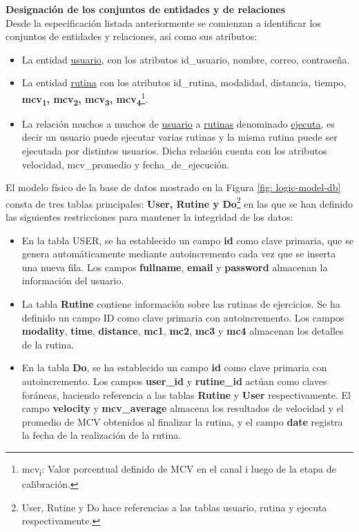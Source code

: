 \textbf{Designación de los conjuntos de entidades y de relaciones}\\
Desde la especificación listada anteriormente se comienzan a
identificar los conjuntos de entidades y relaciones, así como sus atributos:
\begin{itemize}
    \item La entidad \underline{usuario}, con los atributos id\_usuario, nombre, correo, contraseña.
    \item La entidad \underline{rutina} con los atributos id\_rutina, modalidad, distancia, tiempo, \textbf{mcv\textsubscript{1}, mcv\textsubscript{2}, mcv\textsubscript{3}, mcv\textsubscript{4}}\footnote{mcv\textsubscript{i}: Valor porcentual definido de MCV en el canal i luego de la etapa de calibración.}.
    \item La relación muchos a muchos de \underline{usuario} a \underline{rutinas} denominado \underline{ejecuta}, es decir un usuario puede ejecutar 
    varias rutinas y la misma rutina puede ser ejecutada por distintos usuarios. Dicha relación cuenta con los atributos velocidad, mcv\_promedio y fecha\_de\_ejecución. 
\end{itemize}
    
El modelo físico de la base de datos mostrado en la Figura \ref{fig: logic-model-db} consta de tres tablas principales: \textbf{User, Rutine y Do}\footnote{User, Rutine y Do hace referencias a las tablas usuario, rutina y ejecuta respectivamente.} en las que se han definido las siguientes restricciones para mantener la integridad de los datos:

\begin{itemize}
    \item En la tabla USER, se ha establecido un campo \textbf{id} como clave primaria, que se genera automáticamente mediante autoincremento cada vez que se inserta una nueva fila. Los campos \textbf{fullname}, \textbf{email} y \textbf{password} almacenan la información del usuario.

    \item La tabla \textbf{Rutine} contiene información sobre las rutinas de ejercicios. Se ha definido un campo ID como clave primaria con autoincremento. Los campos \textbf{modality}, \textbf{time}, \textbf{distance}, \textbf{mc1}, \textbf{mc2}, \textbf{mc3} y \textbf{mc4} almacenan los detalles de la rutina.

    \item En la tabla \textbf{Do}, se ha establecido un campo \textbf{id} como clave primaria con autoincremento. Los campos \textbf{user\_id} y \textbf{rutine\_id} actúan como claves foráneas, haciendo referencia a las tablas \textbf{Rutine} y \textbf{User} respectivamente. El campo \textbf{velocity} y \textbf{mcv\_average} almacena los resultados de velocidad y el promedio de MCV obtenidos al finalizar la rutina, y el campo \textbf{date} registra la fecha de la realización de la rutina.
\end{itemize}

